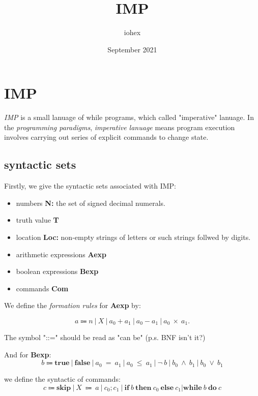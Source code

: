 \documentclass[a4paper, 12pt]{article}
\title{IMP}
\author{iohex}
\date{September 2021}
\begin{document}
    \maketitle
\section{IMP}
    \emph{IMP} is a small lanuage of while programs, which called "imperative" lanuage.
    In the \emph{programming paradigms}, \emph{imperative lanuage} means program execution involves carrying out series of explicit commands to change state.

    \subsection*{syntactic sets}
    Firstly, we give the syntactic sets associated with IMP:

        \begin{itemize}
            \item numbers \textbf{N:} the set of signed decimal numerals.
            \item truth value \textbf{T}
            \item location \textbf{Loc:} non-empty strings of letters or such strings follwed by digits.
            \item arithmetic expressions \textbf{Aexp}
            \item boolean expressions \textbf{Bexp}
            \item commands \textbf{Com}
        \end{itemize}
    
    We define the \emph{formation rules} for \textbf{Aexp} by:

    \[
        a \Coloneqq n\ |\ X\ |\ a_0+a_1\ |\ a_0-a_1\ |\ a_0\ \times\ a_1.
    \]

    The symbol "::=" should be read as "can be" (p.s. BNF isn't it?)

    And for \textbf{Bexp}:
    \[
        b \Coloneqq \textbf{true}\ |\ \textbf{false}\ |\ a_0\ =\ a_1\ |\ a_0\ \leq\ a_1\ |\ \neg\ b\ |\ b_0\ \wedge\ b_1\ |\ b_0\ \lor\ b_1
    \]

    we define the syntactic of commands:
    \[
        c \Coloneqq \textbf{skip}\ |\ X\ \Coloneq\ a\ |\ c_0;c_1\ |\ \textbf{if}\ b\ \textbf{then}\ c_0\  \textbf{else}\ c_1 | \textbf{while}\ b\ \textbf{do}\ c
    \]
\end{document}
